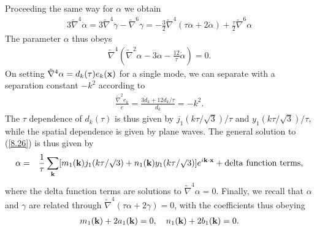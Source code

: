 \documentclass[aps,onecolumn,10pt]{revtex4}
\numberwithin{equation}{section}
\numberwithin{equation}{section}
\begin{document}
Proceeding the same way for $\alpha$  we obtain 
%
\begin{eqnarray}
3\tilde{\nabla}^4\dot{\alpha}=3\tilde{\nabla}^4\ddot{\gamma}-\tilde{\nabla}^6\gamma
=-\frac{3}{2}\tilde{\nabla}^4(\tau\ddot{\alpha}+2\dot{\alpha})+\frac{\tau}{2}\tilde{\nabla}^6\alpha
\label{8.25}
\end{eqnarray}
%
The parameter $\alpha$ thus obeys
%
\begin{eqnarray}
\tilde{\nabla}^4\left(\tilde{\nabla}^2\alpha-3\ddot{\alpha}-\frac{12}{\tau}\dot{\alpha}\right)=0.
\label{8.26}
\end{eqnarray}
%
On setting $\tilde{\nabla}^4\alpha=d_k(\tau)e_k({\bf x})$ for a single mode, we can separate with a separation constant $-k^2$ according to
%
\begin{eqnarray}
\frac{\tilde{\nabla}^2e_k}{e}=\frac{3\ddot{d}_k+12\dot{d}_k/\tau}{d_k}=-k^2.
\label{8.27}
\end{eqnarray}
%
The $\tau$ dependence of $d_k(\tau)$ is thus given by $j_1(k\tau/\surd{3})/\tau$ and  $y_1(k\tau/\surd{3})/\tau$, while the spatial dependence is given by plane waves. The general solution to (\ref{8.26}) is thus given by 
%
\begin{eqnarray}
\alpha&=&\frac{1}{\tau}\sum_{\bf k}[m_1({\bf k})j_1(k\tau/\surd{3})+n_1({\bf k})y_1(k\tau/\surd{3})]e^{i{\bf k}\cdot{\bf x}} +{\rm delta~function~terms},
\label{8.28}
\end{eqnarray}
%
where the delta function terms are solutions to $\tilde{\nabla}^4\alpha=0$. Finally, we recall that $\alpha$ and $\gamma$ are related through $\tilde{\nabla}^4(\tau\alpha+2\gamma)=0$,  with the coefficients  thus obeying
%
\begin{eqnarray}
 m_1({\bf k})+2a_1({\bf k})=0,\quad n_1({\bf k})+2b_1({\bf k})=0.
\label{8.29}
\end{eqnarray}
%
\end{document}
